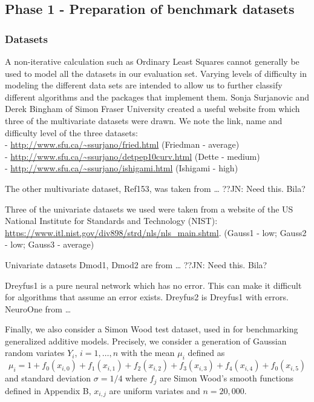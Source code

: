 \hypertarget{phase-1---preparation-of-benchmark-datasets}{%
\subsection{Phase 1 - Preparation of benchmark
datasets}\label{phase-1---preparation-of-benchmark-datasets}}

\hypertarget{datasets}{%
\subsubsection{Datasets}\label{datasets}}

A non-iterative calculation such as Ordinary Least Squares cannot
generally be used to model all the datasets in our evaluation set.
Varying levels of difficulty in modeling the different data sets are
intended to allow us to further classify different algorithms and the
packages that implement them. Sonja Surjanovic and Derek Bingham of
Simon Fraser University created a useful website from which three of the
multivariate datasets were drawn. We note the link, name and difficulty
level of the three datasets:\\
- \url{http://www.sfu.ca/~ssurjano/fried.html} (Friedman - average)\\
- \url{http://www.sfu.ca/~ssurjano/detpep10curv.html} (Dette - medium)\\
- \url{http://www.sfu.ca/~ssurjano/ishigami.html} (Ishigami - high)

The other multivariate dataset, Ref153, was taken from \ldots{} ??JN:
Need this. Bila?

Three of the univariate datasets we used were taken from a website of
the US National Institute for Standards and Technology (NIST):
\url{https://www.itl.nist.gov/div898/strd/nls/nls_main.shtml}. (Gauss1 -
low; Gauss2 - low; Gauss3 - average)

Univariate datasets Dmod1, Dmod2 are from \ldots{} ??JN: Need this.
Bila?

Dreyfus1 is a pure neural network which has no error. This can make it
difficult for algorithms that assume an error exists. Dreyfus2 is
Dreyfus1 with errors. NeuroOne from \ldots{}

Finally, we also consider a Simon Wood test dataset, used in
\citep{wood2011fast} for benchmarking generalized additive models.
Precisely, we consider a generation of Gaussian random variates \(Y_i\),
\(i=1,\dots,n\) with the mean \(\mu_i\) defined as \[
\mu_i = 1+ f_0(x_{i,0})+f_1(x_{i,1})+f_2(x_{i,2})+f_3(x_{i,3})
+f_4(x_{i,4})+f_0(x_{i,5})
\] and standard deviation \(\sigma=1/4\) where \(f_j\) are Simon Wood's
smooth functions defined in Appendix B, \(x_{i,j}\) are uniform variates
and \(n=20,000\).

